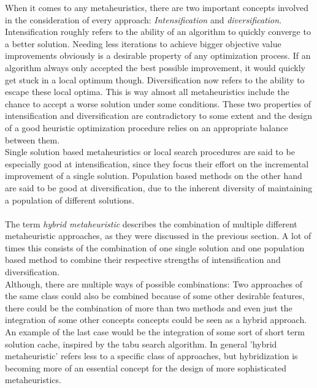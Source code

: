When it comes to any metaheuristics, there are two important concepts involved in the consideration of every approach: \textit{Intensification} and \textit{diversification}. Intensification roughly refers to the ability of an algorithm to quickly converge to a better solution. Needing less iterations to achieve bigger objective value improvements obviously is a desirable property of any optimization process. If an algorithm always only accepted the best possible improvement, it would quickly get stuck in a local optimum though. Diversification now refers to the ability to escape these local optima. This is way almost all metaheuristics include the chance to accept a worse solution under some conditions. These two properties of intensification and diversification are contradictory to some extent and the design of a good heuristic optimization procedure relies on an appropriate balance between them.\\ %
Single solution based metaheuristics or local search procedures are said to be especially good at intensification, since they focus their effort on the incremental improvement of a single solution. Population based methods on the other hand are said to be good at diversification, due to the inherent diversity of maintaining a population of different solutions.\\ \\
The term \textit{hybrid metaheuristic} describes the combination of multiple different metaheuristic approaches, as they were discussed in the previous section. A lot of times this consists of the combination of one single solution and one population based method to combine their respective strengths of intensification and diversification. \cite{vidal_heuristics_2013}\\
Although, there are multiple ways of possible combinations: Two approaches of the same class could also be combined because of some other desirable features, there could be the combination of more than two methods and even just the integration of some other concepts concepts could be seen as a hybrid approach. An example of the last case would be the integration of some sort of short term solution cache, inspired by the tabu search algorithm. In general 'hybrid metaheuristic' refers less to a specific class of approaches, but hybridization is becoming more of an essential concept for the design of more sophisticated metaheuristics.\\ \\
